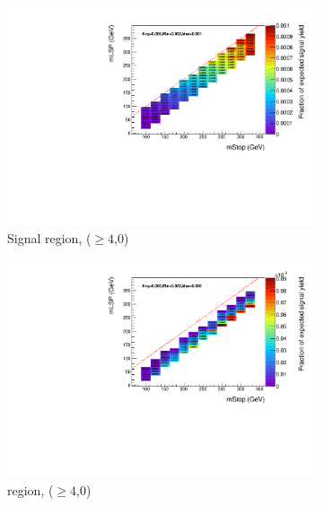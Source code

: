 \begin{figure}[ht!]
\begin{subfigure}[b]{0.47\textwidth}
    \includegraphics[width=\textwidth]{Figs/sms/t2degen/v23/effs/T2_4body_had_eff_maps_eq0b_ge4j_SITV.pdf}
    \caption{Signal region, ($\geq 4$,0)}
    \label{fig:t2_4body_sig_eff_ge4j_0b}
  \end{subfigure}
  \begin{subfigure}[b]{0.47\textwidth}
    \includegraphics[width=\textwidth]{Figs/sms/t2degen/v23/effs/T2_4body_muon_eff_maps_eq0b_ge4j_SITV.pdf}
    \caption{\mj region, ($\geq 4$,0)}
    \label{fig:t2_4body_mu_eff_ge4j_0b}
  \end{subfigure} \\
  \begin{subfigure}[b]{0.47\textwidth}

\end{subfigure}
\end{figure}
